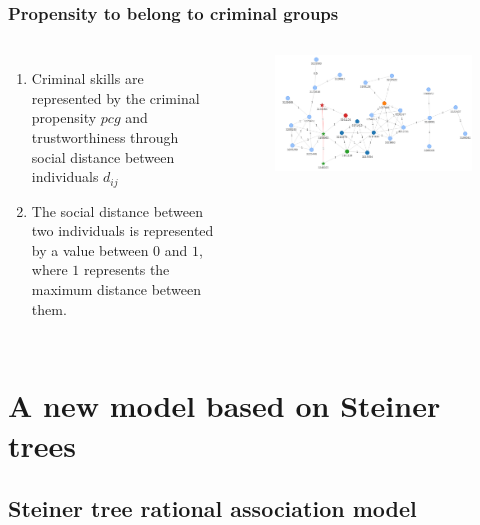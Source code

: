 \documentclass[aspectratio=169]{beamer}
\begin{document}
\begin{frame}
\frametitle{Propensity to belong to criminal groups}
  \begin{columns}
    \begin{enumerate}
      \item Criminal skills are represented by the criminal propensity $pcg$ and trustworthiness through social distance between individuals $d_{ij}$
      \item The social distance between two individuals is represented by a value between $0$ and $1$, where $1$ represents the maximum distance between them.
    \end{enumerate}
    \begin{figure}[ht]
      \centering
      \includegraphics[width=\textwidth]{images/network.png}
    \end{figure}
  \end{columns}
\end{frame}

\section[A new model based on Steiner trees]{A new model based on Steiner trees}
\subsection[StRAM]{Steiner tree rational association model}
\end{document}
